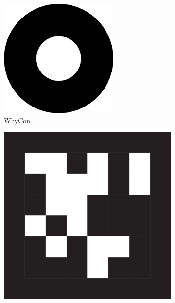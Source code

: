 \begin{figure}[]
    \begin{subfigure}[b]{0.2\linewidth}
        \includegraphics[width=\textwidth]{images/whycon_example}
        \caption{WhyCon}
        \label{figure:whycon}
    \end{subfigure}
    \begin{subfigure}[b]{0.2\linewidth}
        \includegraphics[width=\textwidth]{images/tag_36h11_borderless}

\end{subfigure}
\end{figure}
